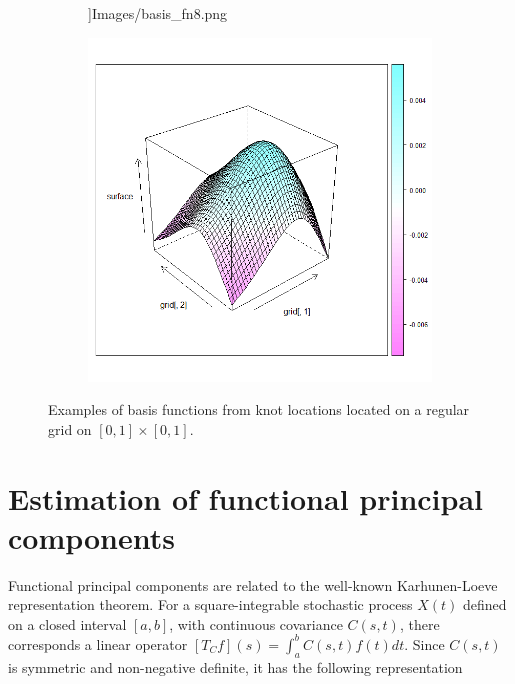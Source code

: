 \begin{figure}
\begin{subfigure}
		\textwidth]{Images/basis_fn8.png}   
	\end{subfigure}
	\begin{subfigure}
		[b]{0.30\textwidth} \centering 
		\includegraphics[width= 
		\textwidth]{Images/basis_fn9.png}  
	\end{subfigure}
	\caption{Examples of basis functions from knot locations located on a regular grid on $[0,1]\times [0,1]$.} \label{fig:basis functions} 
\end{figure}

\section{Estimation of functional principal components} 

\label{sec:estimation_of_functional_principal_components}

Functional principal components are related to the well-known Karhunen-Loeve representation theorem. For a square-integrable stochastic process $X(t)$ defined on a closed interval $[a,b]$, with continuous covariance $C(s,t)$, there corresponds a linear operator $[T_Cf](s) = \int_a^bC(s,t)f(t)dt$. Since $C(s,t)$ is symmetric and non-negative definite, it has the following representation 

